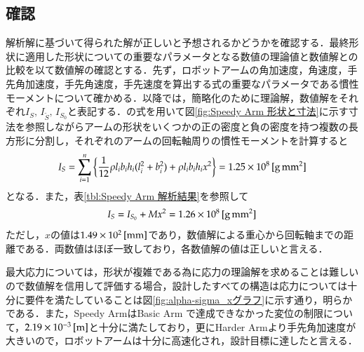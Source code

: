 \documentclass[10pt,b5paper,papersize,dvipdfmx]{jsbook}
\begin{document}
\subsection{確認}
解析解に基づいて得られた解が正しいと予想されるかどうかを確認する．最終形状に適用した形状についての重要なパラメータとなる数値の理論値と数値解との比較を以て数値解の確認とする．先ず，ロボットアームの角加速度，角速度，手先角加速度，手先角速度，手先速度を算出する式の重要なパラメータである慣性モーメントについて確かめる．以降では，簡略化のために理論解，数値解をそれぞれ$I_S,\,I_{\tilde{S}},\,I_{S_0}$と表記する．の式を用いて図\ref{fig:Speedy Arm 形状と寸法}に示す寸法を参照しながらアームの形状をいくつかの正の密度と負の密度を持つ複数の長方形に分割し，それぞれのアームの回転軸周りの慣性モーメントを計算すると
\begin{align}
  I_S =\sum_{i=1}^{n} \left\{ \frac{1}{12} \rho l_ib_ih_i(l_i^2+b_i^2)+\rho l_ib_ih_ix^2 \right\} %
      =1.25\times10^8\tani*{g\,mm^2}
\end{align}
となる．また，表\ref{tbl:Speedy Arm 解析結果}を参照して
\begin{align}
  I_S = I_{S_0}+Mx^2 %
      = 1.26\times10^8\tani*{g\,mm^2}
\end{align}
ただし，$x$の値は$1.49\times10^2 \tani*{mm}$であり，数値解による重心から回転軸までの距離である．両数値はほぼ一致しており，各数値解の値は正しいと言える．\par
最大応力については，形状が複雑である為に応力の理論解を求めることは難しいので数値解を信用して評価する場合，設計したすべての構造は応力については十分に要件を満たしていることは図\ref{fig:alpha-sigma_xグラフ}に示す通り，明らかである．また，Speedy ArmはBasic Arm で達成できなかった変位の制限について，$2.19\times10^{-3} \tani*{m}$と十分に満たしており，更にHarder Armより手先角加速度が大きいので，ロボットアームは十分に高速化され，設計目標に達したと言える．
\end{document}
